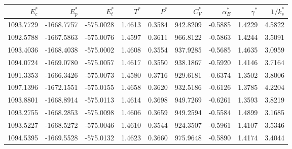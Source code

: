 \begin{tabular}{rrrrrrrrr}
\toprule
$E_c^*$ & $E_p^*$ & $E_t^*$ & $T^*$ & $P^*$ & $C_V^*$ & $\alpha_E^*$ & $\gamma^*$ & $1/k_s^*$ \\
\midrule
1093.7729 & -1668.7757 & -575.0028 & 1.4613 & 0.3584 & 942.8209 & -0.5885 & 1.4229 & 4.5822 \\
1092.5788 & -1667.5863 & -575.0076 & 1.4597 & 0.3611 & 966.8122 & -0.5863 & 1.4244 & 3.5091 \\
1093.4036 & -1668.4038 & -575.0002 & 1.4608 & 0.3554 & 937.9285 & -0.5685 & 1.4635 & 3.0959 \\
1094.0724 & -1669.0780 & -575.0057 & 1.4617 & 0.3550 & 938.1867 & -0.5920 & 1.4146 & 3.7164 \\
1091.3353 & -1666.3426 & -575.0073 & 1.4580 & 0.3716 & 929.6181 & -0.6374 & 1.3502 & 3.8006 \\
1097.1396 & -1672.1551 & -575.0155 & 1.4658 & 0.3620 & 932.5186 & -0.6126 & 1.3785 & 4.2204 \\
1093.8801 & -1668.8914 & -575.0113 & 1.4614 & 0.3698 & 949.7269 & -0.6261 & 1.3593 & 3.8219 \\
1093.2755 & -1668.2853 & -575.0098 & 1.4606 & 0.3659 & 949.2594 & -0.5584 & 1.4899 & 3.1685 \\
1093.5227 & -1668.5272 & -575.0046 & 1.4610 & 0.3544 & 924.3507 & -0.5961 & 1.4107 & 3.5346 \\
1094.5395 & -1669.5528 & -575.0132 & 1.4623 & 0.3660 & 975.9648 & -0.5890 & 1.4174 & 3.4044 \\
\bottomrule
\end{tabular}

